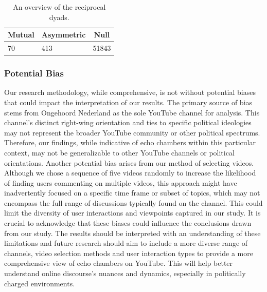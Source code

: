 \documentclass[
  man,floatsintext]{apa6}
\begin{document}
\begin{table}[!h]

\begin{center}
\begin{threeparttable}

\caption{\label{tab:dyad-count-table}An overview of the reciprocal dyads.}

\begin{tabular}{lll}
\toprule
Mutual & \multicolumn{1}{c}{Asymmetric} & \multicolumn{1}{c}{Null}\\
\midrule
70 & 413 & 51843\\
\bottomrule
\end{tabular}

\end{threeparttable}
\end{center}

\end{table}

\hfill\break

\subsubsection{\texorpdfstring{Potential Bias\\
}{Potential Bias }}\label{potential-bias}

Our research methodology, while comprehensive, is not without potential biases that could impact the interpretation of our results. The primary source of bias stems from Ongehoord Nederland as the sole YouTube channel for analysis. This channel's distinct right-wing orientation and ties to specific political ideologies may not represent the broader YouTube community or other political spectrums. Therefore, our findings, while indicative of echo chambers within this particular context, may not be generalizable to other YouTube channels or political orientations.
Another potential bias arises from our method of selecting videos. Although we chose a sequence of five videos randomly to increase the likelihood of finding users commenting on multiple videos, this approach might have inadvertently focused on a specific time frame or subset of topics, which may not encompass the full range of discussions typically found on the channel. This could limit the diversity of user interactions and viewpoints captured in our study.
It is crucial to acknowledge that these biases could influence the conclusions drawn from our study. The results should be interpreted with an understanding of these limitations and future research should aim to include a more diverse range of channels, video selection methods and user interaction types to provide a more comprehensive view of echo chambers on YouTube. This will help better understand online discourse's nuances and dynamics, especially in politically charged environments. \newpage
\end{document}

